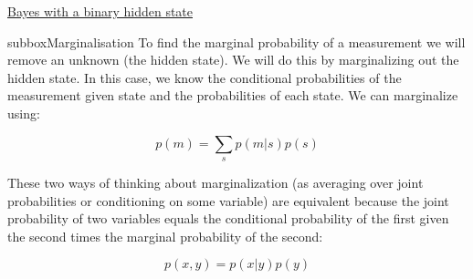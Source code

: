 \begin{textbox}{\href{https://compneuro.neuromatch.io/tutorials/W3D1_BayesianDecisions/student/W3D1_Tutorial1.html}{Bayes with a binary hidden state } }
\begin{subbox}{subbox}{Marginalisation}
To find the marginal probability of a measurement we will remove an unknown (the hidden state). We will do this by marginalizing out the hidden state. In this case, we know the conditional probabilities of the measurement given state and the probabilities of each state. We can marginalize using:

$$p(m) = \sum_s p(m | s) p(s) $$

These two ways of thinking about marginalization (as averaging over joint probabilities or conditioning on some variable) are equivalent because the joint probability of two variables equals the conditional probability of the first given the second times the marginal probability of the second:

$$p(x, y) = p(x|y)p(y)$$ 


\end{subbox}

\end{textbox}
